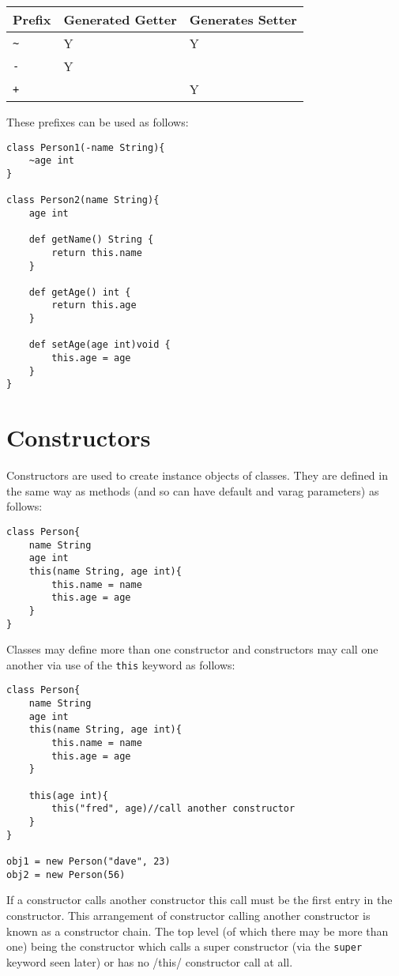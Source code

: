 \documentclass[conc-doc]{subfiles}
\begin{document}
\begin{table}[H]
	\centering
	\begin{tabular}{lll}
		\hline
		Prefix&Generated Getter&Generates Setter\\
		\hline
		\lstinline!~!&Y&Y\\
		\lstinline!-!&Y&\\
		\lstinline!+!&&Y\\
		\hline
	\end{tabular}%
\end{table}


These prefixes can be used as follows:

\begin{lstlisting}
class Person1(-name String){
	~age int
}

class Person2(name String){
	age int
	
	def getName() String {
		return this.name
	} 
	
	def getAge() int {
		return this.age
	}
	
	def setAge(age int)void {
		this.age = age
	}
}
\end{lstlisting}

\section{Constructors}
Constructors are used to create instance objects of classes. They are defined in the same way as methods (and so can have default and varag parameters) as follows:

\begin{lstlisting}
class Person{
	name String
	age int
	this(name String, age int){
		this.name = name
		this.age = age
	}
}
\end{lstlisting}

Classes may define more than one constructor and constructors may call one another via use of the \lstinline{this} keyword as follows:

\begin{lstlisting}
class Person{
	name String
	age int
	this(name String, age int){
		this.name = name
		this.age = age
	}
	
	this(age int){
		this("fred", age)//call another constructor
	}
}

obj1 = new Person("dave", 23)
obj2 = new Person(56)
\end{lstlisting}

If a constructor calls another constructor this call must be the first entry in the constructor. This arrangement of constructor calling another constructor is known as a constructor chain. The top level (of which there may be more than one) being the constructor which calls a super constructor (via the \lstinline{super} keyword seen later) or has no /this/ constructor call at all.
\end{document}
